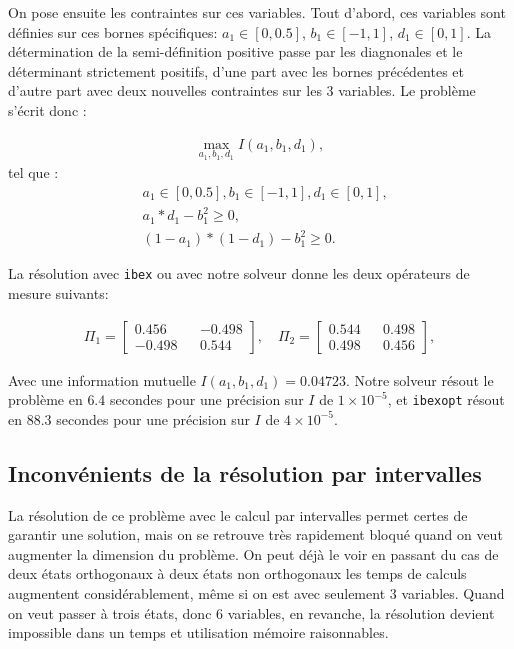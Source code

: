 \documentclass[12pt,a4paper]{article}
\begin{document}
    On pose ensuite les contraintes sur ces variables. Tout d'abord, ces variables sont définies sur ces bornes spécifiques: $a_1 \in [0, 0.5]$, $b_1 \in [-1, 1]$, $d_1 \in [0, 1]$. La détermination de la semi-définition positive passe par les diagnonales et le déterminant strictement positifs, d'une part avec les bornes précédentes et d'autre part avec deux nouvelles contraintes sur les 3 variables.
    Le problème s'écrit donc :

    \begin{align}
        \max\limits_{a_1, b_1, d_1} I(a_1, b_1, d_1) , \nonumber
    \end{align}
    tel que :
    \begin{align}
        &a_1 \in [0, 0.5] , b_1 \in [-1, 1] , d_1 \in [0, 1] , \nonumber \\
        &a_1 * d_1 - b_1^2 \geq 0 , \nonumber \\
        &(1-a_1) * (1-d_1) - b_1^2 \geq 0. \nonumber
    \end{align}

    La résolution avec \texttt{ibex} ou avec notre solveur donne les deux opérateurs de mesure suivants: 

    \begin{align}
        \Pi_1 = \begin{bmatrix}0.456 && -0.498 \\ -0.498 && 0.544\end{bmatrix}, \quad \Pi_2 = \begin{bmatrix}0.544 && 0.498 \\ 0.498 && 0.456\end{bmatrix},
    \end{align}

    Avec une information mutuelle $I(a_1, b_1, d_1) = 0.04723$. Notre solveur résout le problème en $6.4$ secondes pour une précision sur $I$ de $1 \times 10^{-5}$, et \texttt{ibexopt} résout en $88.3$ secondes pour une précision sur $I$ de $4\times 10^{-5}$.



    \subsection*{Inconvénients de la résolution par intervalles}
    La résolution de ce problème avec le calcul par intervalles permet certes de garantir une solution, mais on se retrouve très rapidement bloqué quand on veut augmenter la dimension du problème. On peut déjà le voir en passant du cas de deux états orthogonaux à deux états non orthogonaux les temps de calculs augmentent considérablement, même si on est avec seulement 3 variables. Quand on veut passer à trois états, donc 6 variables, en revanche, la résolution devient impossible dans un temps et utilisation mémoire raisonnables. 
\end{document}
